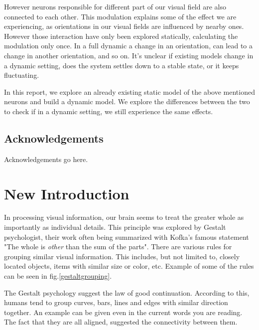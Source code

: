 {However neurons responsible for different part of our visual field are also connected to each other. This modulation explains some of the effect we are experiencing, as orientations in our visual fields are influenced by nearby ones. However those interaction have only been explored statically, calculating the modulation only once. In a full dynamic a change in an orientation, can lead to a change in another orientation, and so on. It's unclear if existing models change in a dynamic setting, does the system settles down to a stable state, or it keeps fluctuating.

In this report, we explore an already existing static model of the above mentioned neurons and build a dynamic model. We explore the differences between the two to check if in a dynamic setting, we still experience the same effects. 
}

\maketitle

\section*{Acknowledgements}
Acknowledgements go here. 

\tableofcontents


\chapter{New Introduction}
In processing visual information, our brain seems to treat the greater whole as importantly as individual details. This principle was explored by Gestalt psychologist, their work often being summarized with Kofka's famous statement "The whole is \textit{other} than the sum of the parts". There are various rules for grouping similar visual information. This includes, but not limited to, closely located objects, items with similar size or color, etc. Example of some of the rules can be seen in fig.\ref{gestaltgrouping}. 



The Gestalt psychology suggest the law of good continuation. According to this, humans tend to group curves, bars, lines and edges with similar direction together. An example can be given even in the current words you are reading. The fact that they are all aligned, suggested the connectivity between them.

